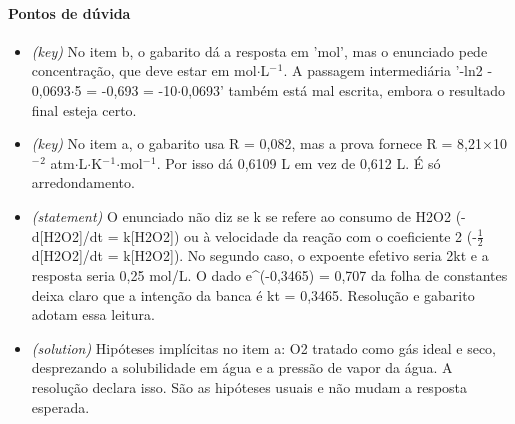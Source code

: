 \documentclass{article}%
\begin{document}
\paragraph{Pontos de dúvida}%
\begin{itemize}%
\item%
\textit{(key)} No item b, o gabarito dá a resposta em 'mol', mas o enunciado pede concentração, que deve estar em mol$\cdot$L$^{-}$$^{1}$. A passagem intermediária '-ln2 - 0,0693$\cdot$5 = -0,693 = -10$\cdot$0,0693' também está mal escrita, embora o resultado final esteja certo.%
\item%
\textit{(key)} No item a, o gabarito usa R = 0,082, mas a prova fornece R = 8,21$\times$10$^{-}$$^2$ atm$\cdot$L$\cdot$K$^{-}$$^{1}$$\cdot$mol$^{-}$$^{1}$. Por isso dá 0,6109 L em vez de 0,612 L. É só arredondamento.%
\item%
\textit{(statement)} O enunciado não diz se k se refere ao consumo de H2O2 (-d{[}H2O2{]}/dt = k{[}H2O2{]}) ou à velocidade da reação com o coeficiente 2 (-$\frac12$ d{[}H2O2{]}/dt = k{[}H2O2{]}). No segundo caso, o expoente efetivo seria 2kt e a resposta seria 0,25 mol/L. O dado e\^{}(-0,3465) = 0,707 da folha de constantes deixa claro que a intenção da banca é kt = 0,3465. Resolução e gabarito adotam essa leitura.%
\item%
\textit{(solution)} Hipóteses implícitas no item a: O2 tratado como gás ideal e seco, desprezando a solubilidade em água e a pressão de vapor da água. A resolução declara isso. São as hipóteses usuais e não mudam a resposta esperada.%
\end{itemize}%
\end{document}

